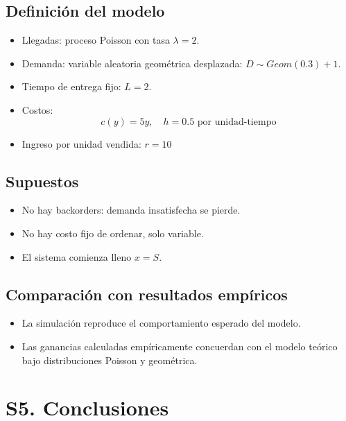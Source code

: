 \documentclass{report}
\begin{document}
\subsection*{Definición del modelo}

\begin{itemize}
\item Llegadas: proceso Poisson con tasa \(\lambda = 2\).
\item Demanda: variable aleatoria geométrica desplazada: \(D \sim Geom(0.3)+1\).
\item Tiempo de entrega fijo: \(L = 2\).
\item Costos:
  \[ c(y) = 5y, \quad h = 0.5 \text{ por unidad-tiempo} \]
\item Ingreso por unidad vendida: \(r = 10\)
\end{itemize}

\subsection*{Supuestos}

\begin{itemize}
\item No hay backorders: demanda insatisfecha se pierde.
\item No hay costo fijo de ordenar, solo variable.
\item El sistema comienza lleno \(x = S\).
\end{itemize}

\subsection*{Comparación con resultados empíricos}

\begin{itemize}
\item La simulación reproduce el comportamiento esperado del modelo.
\item Las ganancias calculadas empíricamente concuerdan con el modelo teórico bajo 
distribuciones Poisson y geométrica.
\end{itemize}


\section*{S5. Conclusiones}
\end{document}
